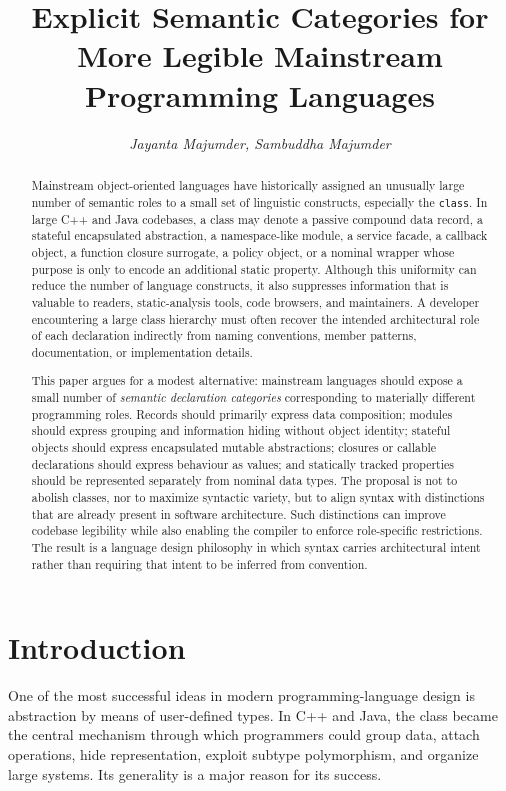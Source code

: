 \documentclass[11pt]{article}
\title{Explicit Semantic Categories for More Legible Mainstream Programming Languages}
\author{\textit{Jayanta Majumder, Sambuddha Majumder}}
\date{}
\begin{document}
\maketitle

\begin{abstract}
Mainstream object-oriented languages have historically assigned an unusually large number of semantic roles to a small set of linguistic constructs, especially the \texttt{class}. In large C++ and Java codebases, a class may denote a passive compound data record, a stateful encapsulated abstraction, a namespace-like module, a service facade, a callback object, a function closure surrogate, a policy object, or a nominal wrapper whose purpose is only to encode an additional static property. Although this uniformity can reduce the number of language constructs, it also suppresses information that is valuable to readers, static-analysis tools, code browsers, and maintainers. A developer encountering a large class hierarchy must often recover the intended architectural role of each declaration indirectly from naming conventions, member patterns, documentation, or implementation details.

This paper argues for a modest alternative: mainstream languages should expose a small number of \emph{semantic declaration categories} corresponding to materially different programming roles. Records should primarily express data composition; modules should express grouping and information hiding without object identity; stateful objects should express encapsulated mutable abstractions; closures or callable declarations should express behaviour as values; and statically tracked properties should be represented separately from nominal data types. The proposal is not to abolish classes, nor to maximize syntactic variety, but to align syntax with distinctions that are already present in software architecture. Such distinctions can improve codebase legibility while also enabling the compiler to enforce role-specific restrictions. The result is a language design philosophy in which syntax carries architectural intent rather than requiring that intent to be inferred from convention.
\end{abstract}

\section{Introduction}

One of the most successful ideas in modern programming-language design is abstraction by means of user-defined types. In C++ and Java, the class became the central mechanism through which programmers could group data, attach operations, hide representation, exploit subtype polymorphism, and organize large systems. Its generality is a major reason for its success.
\end{document}
